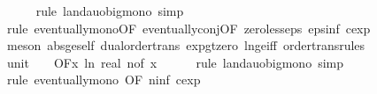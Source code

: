 \begin{isabellebody}
\ \ \ \ \isamarkupfalse%
\ {\isacharparenleft}{\kern0pt}rule\ landau{\isacharunderscore}{\kern0pt}o{\isachardot}{\kern0pt}big{\isacharunderscore}{\kern0pt}mono{\isacharcomma}{\kern0pt}\ simp{\isacharparenright}{\kern0pt}\isanewline
\ \ \ \ \isamarkupfalse%
\ {\isacharparenleft}{\kern0pt}rule\ eventually{\isacharunderscore}{\kern0pt}mono{\isacharbrackleft}{\kern0pt}OF\ eventually{\isacharunderscore}{\kern0pt}conj{\isacharbrackleft}{\kern0pt}OF\ zero{\isacharunderscore}{\kern0pt}less{\isacharunderscore}{\kern0pt}eps\ eps{\isacharunderscore}{\kern0pt}inf{\isacharbrackleft}{\kern0pt}\ c{\isacharequal}{\kern0pt}{\isachardoublequoteopen}exp\ {}{\isachardoublequoteclose}{\isacharbrackright}{\kern0pt}{\isacharbrackright}{\kern0pt}{\isacharbrackright}{\kern0pt}{\isacharparenright}{\kern0pt}\isanewline
\ \ \ \ \isamarkupfalse%
\ {\isacharparenleft}{\kern0pt}meson\ abs{\isacharunderscore}{\kern0pt}ge{\isacharunderscore}{\kern0pt}self\ dual{\isacharunderscore}{\kern0pt}order{\isachardot}{\kern0pt}trans\ exp{\isacharunderscore}{\kern0pt}gt{\isacharunderscore}{\kern0pt}zero\ ln{\isacharunderscore}{\kern0pt}ge{\isacharunderscore}{\kern0pt}iff\ order{\isacharunderscore}{\kern0pt}trans{\isacharunderscore}{\kern0pt}rules{\isacharparenleft}{\kern0pt}{}{}{\isacharparenright}{\kern0pt}{\isacharparenright}{\kern0pt}\isanewline
\isanewline
\ \ \isamarkupfalse%
\ unit{\isacharunderscore}{\kern0pt}{}{}{\isacharcolon}{\kern0pt}\ {\isachardoublequoteopen}{\isacharparenleft}{\kern0pt}{\isasymlambda}{\isacharunderscore}{\kern0pt}{\isachardot}{\kern0pt}\ {}{\isacharparenright}{\kern0pt}\ {\isasymin}\ O{\isacharbrackleft}{\kern0pt}{\isacharquery}{\kern0pt}F{\isacharbrackright}{\kern0pt}{\isacharparenleft}{\kern0pt}{\isasymlambda}x{\isachardot}{\kern0pt}\ ln\ {\isacharparenleft}{\kern0pt}real\ {\isacharparenleft}{\kern0pt}n{\isacharunderscore}{\kern0pt}of\ x{\isacharparenright}{\kern0pt}{\isacharparenright}{\kern0pt}{\isacharparenright}{\kern0pt}{\isachardoublequoteclose}\isanewline
\ \ \ \ \isamarkupfalse%
\ {\isacharparenleft}{\kern0pt}rule\ landau{\isacharunderscore}{\kern0pt}o{\isachardot}{\kern0pt}big{\isacharunderscore}{\kern0pt}mono{\isacharcomma}{\kern0pt}\ simp{\isacharparenright}{\kern0pt}\isanewline
\ \ \ \ \isamarkupfalse%
\ {\isacharparenleft}{\kern0pt}rule\ eventually{\isacharunderscore}{\kern0pt}mono\ {\isacharbrackleft}{\kern0pt}OF\ n{\isacharunderscore}{\kern0pt}inf{\isacharbrackleft}{\kern0pt}\ c{\isacharequal}{\kern0pt}{\isachardoublequoteopen}exp\ {}{\isachardoublequoteclose}{\isacharbrackright}{\kern0pt}{\isacharbrackright}{\kern0pt}{\isacharparenright}{\kern0pt}\ \isanewline

\end{isabellebody}

